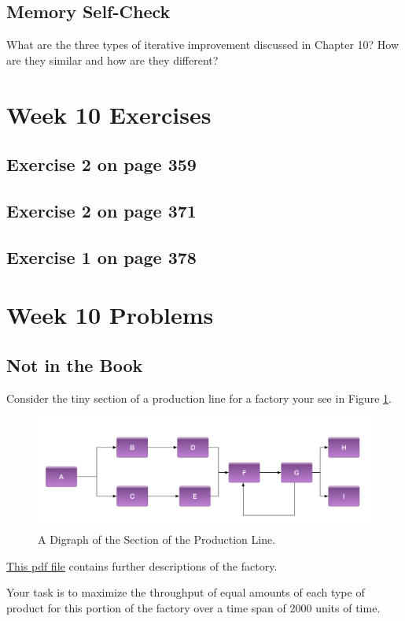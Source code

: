 \documentclass[12pt]{amsart}
\begin{document}
\subsection{Memory Self-Check}
What are the three types of iterative improvement discussed in Chapter 10? How are they similar and how are they different?
 \section{Week 10 Exercises}
\subsection{ Exercise 2 on page 359}
\subsection{Exercise 2 on page 371} 
\subsection{Exercise 1 on page 378} 


\section{Week 10 Problems}
\subsection{Not in the Book}
Consider the tiny section of a production line for a factory your see in Figure \ref{fig:factory1}. 
\begin{figure}[htb]
  \includegraphics[width=\linewidth]{../support_files/tiny_factory.png}
  \caption{A Digraph of the Section of the Production Line.}
  \label{fig:factory1}
\end{figure}

\href{run:../support_files/tiny_factory_step_descriptions.pdf}{This pdf file} contains further descriptions of the factory.

Your task is to maximize the throughput of equal amounts of each type of product for this portion of the factory over a time span of 2000 units of time.
\end{document}
